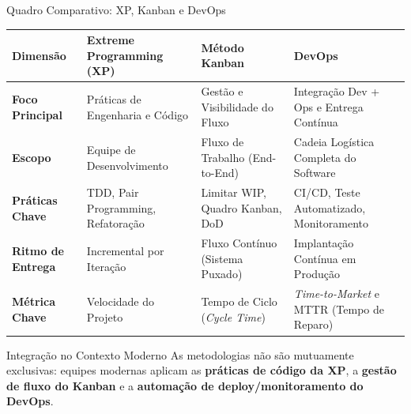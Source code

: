\documentclass[aspectratio=169, 9pt]{beamer}
\begin{document}
\begin{frame}{Quadro Comparativo: XP, Kanban e DevOps}
  \begin{table}
    \centering
    \tiny
    \begin{tabular}{@{}llll@{}}
      \toprule
      \textbf{Dimensão} & \textbf{Extreme Programming (XP)} & \textbf{Método Kanban} & \textbf{DevOps} \\
      \midrule
      \textbf{Foco Principal} & Práticas de Engenharia e Código & Gestão e Visibilidade do Fluxo & Integração Dev + Ops e Entrega Contínua \\
      \textbf{Escopo} & Equipe de Desenvolvimento & Fluxo de Trabalho (End-to-End) & Cadeia Logística Completa do Software \\
      \textbf{Práticas Chave} & TDD, Pair Programming, Refatoração & Limitar WIP, Quadro Kanban, DoD & CI/CD, Teste Automatizado, Monitoramento \\
      \textbf{Ritmo de Entrega} & Incremental por Iteração & Fluxo Contínuo (Sistema Puxado) & Implantação Contínua em Produção \\
      \textbf{Métrica Chave} & Velocidade do Projeto & Tempo de Ciclo (\textit{Cycle Time}) & \textit{Time-to-Market} e MTTR (Tempo de Reparo) \\
      \bottomrule
    \end{tabular}
  \end{table}

  \vspace{0.3cm}

  \begin{block}{Integração no Contexto Moderno}
    As metodologias não são mutuamente exclusivas: equipes modernas aplicam as \textbf{práticas de código da XP}, a \textbf{gestão de fluxo do Kanban} e a \textbf{automação de deploy/monitoramento do DevOps}.
  \end{block}
\end{frame}
\end{document}
